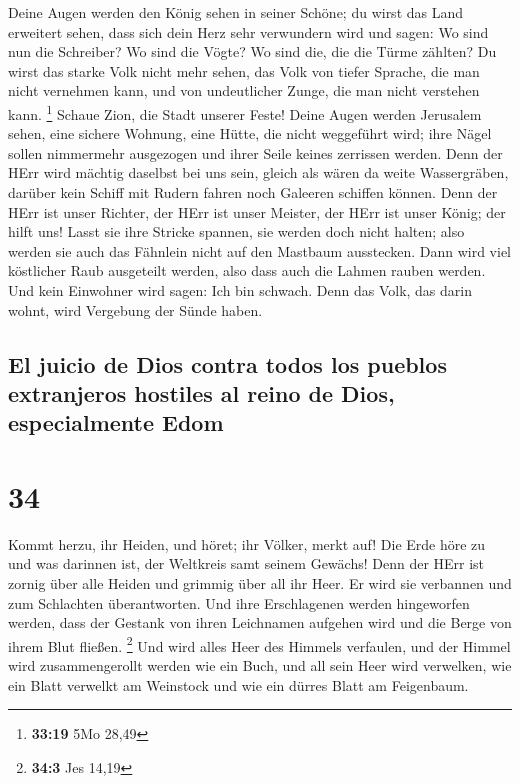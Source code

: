  Deine Augen werden den König sehen in seiner Schöne; du
wirst das Land erweitert sehen,  dass sich dein Herz sehr
verwundern wird und sagen: Wo sind nun die Schreiber? Wo sind die Vögte?
Wo sind die, die die Türme zählten?  Du wirst das starke
Volk nicht mehr sehen, das Volk von tiefer Sprache, die man nicht
vernehmen kann, und von undeutlicher Zunge, die man nicht verstehen
kann. \footnote{\textbf{33:19} 5Mo 28,49}  Schaue Zion,
die Stadt unserer Feste! Deine Augen werden Jerusalem sehen, eine
sichere Wohnung, eine Hütte, die nicht weggeführt wird; ihre Nägel
sollen nimmermehr ausgezogen und ihrer Seile keines zerrissen werden.
 Denn der HErr wird mächtig daselbst bei uns sein, gleich
als wären da weite Wassergräben, darüber kein Schiff mit Rudern fahren
noch Galeeren schiffen können.  Denn der HErr ist unser
Richter, der HErr ist unser Meister, der HErr ist unser König; der hilft
uns!  Lasst sie ihre Stricke spannen, sie werden doch
nicht halten; also werden sie auch das Fähnlein nicht auf den Mastbaum
ausstecken. Dann wird viel köstlicher Raub ausgeteilt werden, also dass
auch die Lahmen rauben werden.  Und kein Einwohner wird
sagen: Ich bin schwach. Denn das Volk, das darin wohnt, wird Vergebung
der Sünde haben.

\hypertarget{el-juicio-de-dios-contra-todos-los-pueblos-extranjeros-hostiles-al-reino-de-dios-especialmente-edom}{%
\subsection{El juicio de Dios contra todos los pueblos extranjeros
hostiles al reino de Dios, especialmente
Edom}\label{el-juicio-de-dios-contra-todos-los-pueblos-extranjeros-hostiles-al-reino-de-dios-especialmente-edom}}

\hypertarget{section-33}{%
\section{34}\label{section-33}}

 Kommt herzu, ihr Heiden, und höret; ihr Völker, merkt
auf! Die Erde höre zu und was darinnen ist, der Weltkreis samt seinem
Gewächs!  Denn der HErr ist zornig über alle Heiden und
grimmig über all ihr Heer. Er wird sie verbannen und zum Schlachten
überantworten.  Und ihre Erschlagenen werden hingeworfen
werden, dass der Gestank von ihren Leichnamen aufgehen wird und die
Berge von ihrem Blut fließen. \footnote{\textbf{34:3} Jes 14,19}
 Und wird alles Heer des Himmels verfaulen, und der Himmel
wird zusammengerollt werden wie ein Buch, und all sein Heer wird
verwelken, wie ein Blatt verwelkt am Weinstock und wie ein dürres Blatt
am Feigenbaum.

